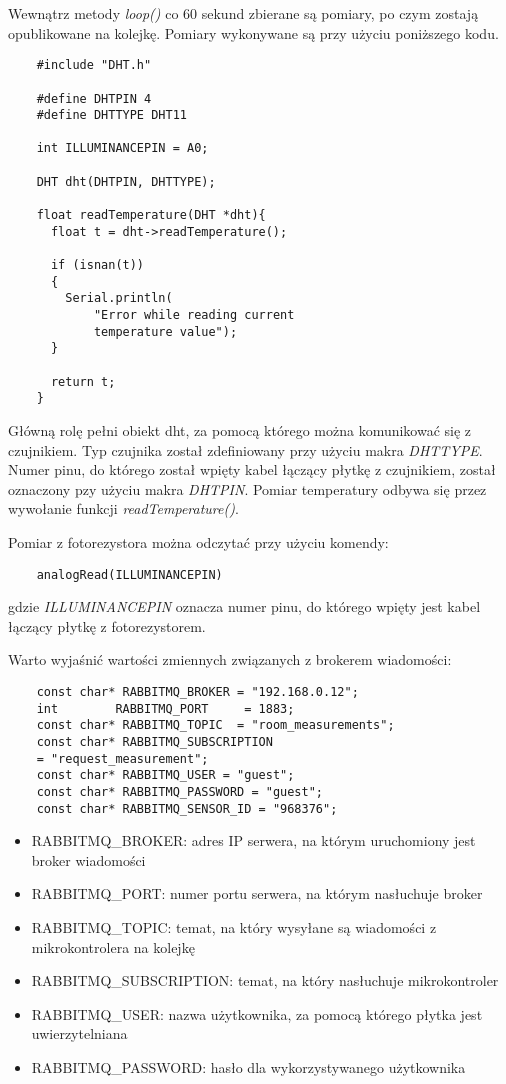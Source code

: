 Wewnątrz metody \textit{loop()} co 60 sekund zbierane są pomiary, po czym zostają opublikowane
na kolejkę. Pomiary wykonywane są przy użyciu poniższego kodu.

\begin{lstlisting}
    #include "DHT.h"

    #define DHTPIN 4
    #define DHTTYPE DHT11
    
    int ILLUMINANCEPIN = A0;
    
    DHT dht(DHTPIN, DHTTYPE);
    
    float readTemperature(DHT *dht){
      float t = dht->readTemperature();
     
      if (isnan(t))
      {
        Serial.println(
            "Error while reading current 
            temperature value");
      }
      
      return t;
    }
\end{lstlisting}

Główną rolę pełni obiekt dht, za pomocą którego można komunikować się
z czujnikiem. Typ czujnika został zdefiniowany przy użyciu makra \textit{DHTTYPE}.
Numer pinu, do którego został wpięty kabel łączący płytkę z czujnikiem,
został oznaczony pzy użyciu makra \textit{DHTPIN}. Pomiar temperatury odbywa się
przez wywołanie funkcji \textit{readTemperature()}. 

Pomiar z fotorezystora można odczytać przy użyciu komendy:  

\begin{lstlisting}
    analogRead(ILLUMINANCEPIN)
\end{lstlisting}

gdzie \textit{ILLUMINANCEPIN} oznacza numer pinu, do 
którego wpięty jest kabel łączący płytkę z fotorezystorem.

Warto wyjaśnić wartości zmiennych związanych z brokerem wiadomości:
\begin{lstlisting}
    const char* RABBITMQ_BROKER = "192.168.0.12";
    int        RABBITMQ_PORT     = 1883;
    const char* RABBITMQ_TOPIC  = "room_measurements";
    const char* RABBITMQ_SUBSCRIPTION  
    = "request_measurement";
    const char* RABBITMQ_USER = "guest";
    const char* RABBITMQ_PASSWORD = "guest";
    const char* RABBITMQ_SENSOR_ID = "968376";
\end{lstlisting}

\begin{itemize}
    \item RABBITMQ\_BROKER: adres IP serwera, na którym uruchomiony jest broker wiadomości
    \item RABBITMQ\_PORT: numer portu serwera, na którym nasłuchuje broker
    \item RABBITMQ\_TOPIC: temat, na który wysyłane są wiadomości z mikrokontrolera
    na kolejkę
    \item RABBITMQ\_SUBSCRIPTION: temat, na który nasłuchuje mikrokontroler
    \item RABBITMQ\_USER: nazwa użytkownika, za pomocą którego płytka jest uwierzytelniana
    \item RABBITMQ\_PASSWORD: hasło dla wykorzystywanego użytkownika
\end{itemize}

